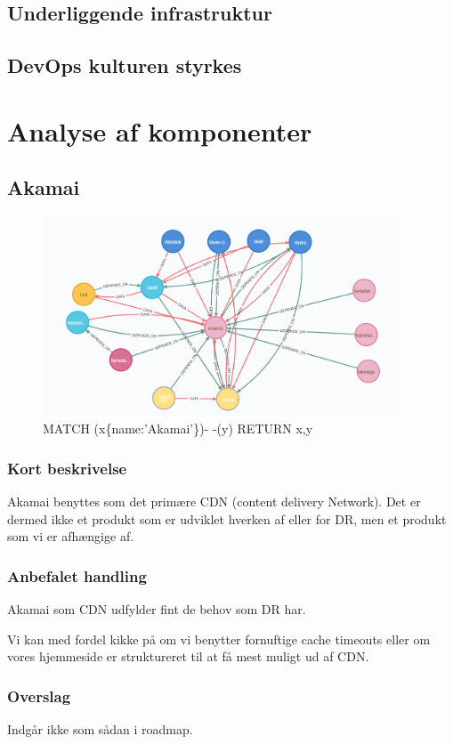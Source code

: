 \documentclass{article}
\begin{document}
\subsection{Underliggende infrastruktur}
\subsection{DevOps kulturen styrkes}


\section{Analyse af komponenter}

\subsection{Akamai}
\begin{figure}[h]
\includegraphics[width=300pt]{Akamai.PNG}
\caption{MATCH (x\{name:'Akamai'\})- -(y) RETURN x,y}
\end{figure}
\subsubsection{Kort beskrivelse}
Akamai benyttes som det primære CDN (content delivery Network). 
Det er dermed ikke et produkt som er udviklet hverken af eller for DR, 
men et produkt som vi er afhængige af. 
\subsubsection{Anbefalet handling}
Akamai som CDN udfylder fint de behov som DR har. 

Vi kan med fordel kikke på om vi benytter fornuftige cache timeouts eller om vores hjemmeside er struktureret til at få mest muligt ud af CDN.
\subsubsection{Overslag}
Indgår ikke som sådan i roadmap.
\end{document}
